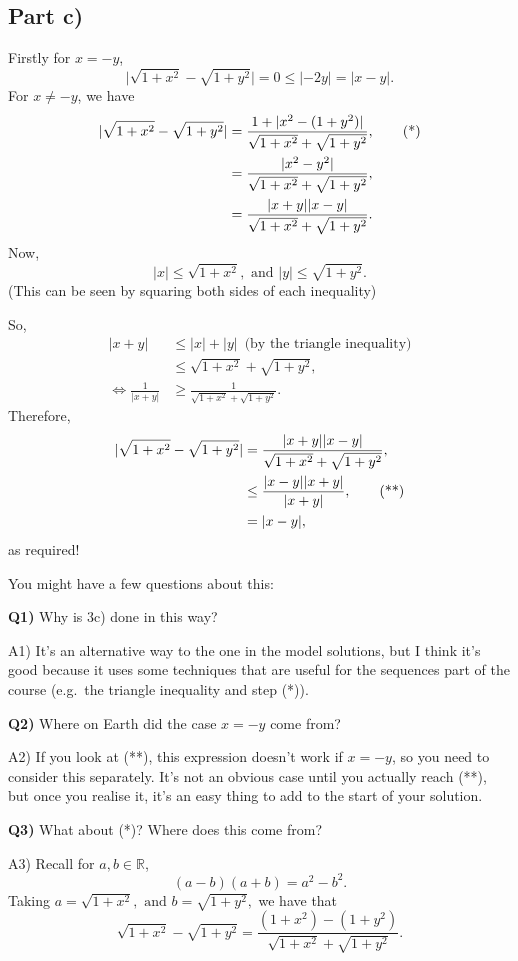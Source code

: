 \documentclass[
  17pt,
  a4paper]{extarticle}
\theoremstyle{plain}
\theoremstyle{definition}
\theoremstyle{plain}
\theoremstyle{plain}
\theoremstyle{plain}
\theoremstyle{plain}
\theoremstyle{definition}
\theoremstyle{definition}
\theoremstyle{remark}
\theoremstyle{remark}
\let\BeginKnitrBlock\begin \let\EndKnitrBlock\end
\renewcommand{\;}{\,}
\begin{document}
\hypertarget{part-c}{%
\subsection*{Part c)}\label{part-c}}

\BeginKnitrBlock{solution*}
Firstly for \(x = -y\), \[\lvert \sqrt{1 + x^2} - \sqrt{1 + y^2}\rvert = 0 \leq \lvert -2y \rvert = \lvert x - y \rvert.\] For \(x \neq -y\), we have
\begin{align}
\lvert \sqrt{1 + x^2} - \sqrt{1 + y^2}\rvert &= \frac{1 + \lvert x^2 - (1 + y^2) \rvert}{\sqrt{1 + x^2} + \sqrt{1 + y^2}},\tag{*}\\
&= \frac{\lvert x^2 - y^2 \rvert}{\sqrt{1 + x^2} + \sqrt{1 + y^2}},\notag\\
&= \frac{\lvert x + y \rvert \lvert x - y \rvert}{\sqrt{1 + x^2} + \sqrt{1 + y^2}}.\notag
\end{align}
Now, \[\lvert x \rvert \leq \sqrt{1 + x^2}, \;\;\text{and}\;\; \lvert y \rvert \leq \sqrt{1 + y^2}.\] (This can be seen by squaring both sides of each inequality)

So,
\begin{align*}
\lvert x + y \rvert &\leq \lvert x \rvert + \lvert y \rvert \;\;\; \text{(by the triangle inequality)}\\
&\leq \sqrt{1 + x^2} + \sqrt{1 + y^2},\\
\Leftrightarrow \frac{1}{\lvert x + y \rvert} &\geq \frac{1}{\sqrt{1 + x^2} + \sqrt{1 + y^2}}.
\end{align*}
Therefore,
\begin{align}
\lvert \sqrt{1 + x^2} - \sqrt{1 + y^2}\rvert &= \frac{\lvert x + y \rvert \lvert x - y \rvert}{\sqrt{1 + x^2} + \sqrt{1 + y^2}},\notag\\
&\leq \frac{\lvert x - y \rvert\lvert x + y \rvert}{\lvert x + y \rvert},\tag{**}\\
& = \lvert x - y \rvert,\notag
\end{align}
as required!
\EndKnitrBlock{solution*}

You might have a few questions about this:

\textbf{Q1)} Why is 3c) done in this way?

A1) It's an alternative way to the one in the model solutions, but I think it's good because it uses some techniques that are useful for the sequences part of the course (e.g.~the triangle inequality and step (*)).

\textbf{Q2)} Where on Earth did the case \(x = -y\) come from?

A2) If you look at (**), this expression doesn't work if \(x = -y\), so you need to consider this separately. It's not an obvious case until you actually reach (**), but once you realise it, it's an easy thing to add to the start of your solution.

\textbf{Q3)} What about (*)? Where does this come from?

A3) Recall for \(a,b \in \mathbb{R}\), \[(a-b)(a+b) = a^2 - b^2.\] Taking \(a = \sqrt{1 + x^2}, \;\; \text{and} \;\; b = \sqrt{1 + y^2},\) we have that \[\sqrt{1 + x^2} - \sqrt{1 + y^2} = \frac{(1+x^2)-(1+y^2)}{\sqrt{1 + x^2} + \sqrt{1 + y^2}}.\]
\end{document}
